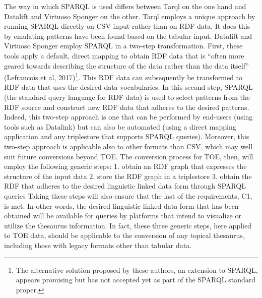The way in which SPARQL is used differs between Tarql on the one hand and Datalift and Virtuoso Sponger on the other. Tarql employs a unique approach by running SPARQL directly on CSV input rather than on RDF data. It does this by emulating patterns have been found based on the tabular input. Datalift and Virtuoso Sponger employ SPARQL in a two-step transformation. First, these tools apply a default, direct mapping to obtain RDF data that is “often more geared towards describing the structure of the data rather than the data itself” (Lefrancois et al, 2017)\footnote{The alternative solution proposed by these authors, an extension to SPARQL, appears promising but has not accepted yet as part of the SPARQL standard proper.}. This RDF data can subsequently be transformed to RDF data that uses the desired data vocabularies. In this second step, SPARQL (the standard query language for RDF data) is used to select patterns from the RDF source and construct new RDF data that adheres to the desired patterns. Indeed, this two-step approach is one that can be performed by end-users (using tools such as Datalink) but can also be automated (using a direct mapping application and any triplestore that supports SPARQL queries). Moreover, this two-step approach is applicable also to other formats than CSV, which may well suit future conversions beyond TOE. The conversion process for TOE, then, will employ the following generic steps:
1.	obtain an RDF graph that expresses the structure of the input data
2.	store the RDF graph in a triplestore
3.	obtain the RDF that adheres to the desired linguistic linked data form through SPARQL queries
Taking these steps will also ensure that the last of the requirements, C1, is met. In other words, the desired linguistic linked data form that has been obtained will be available for queries by platforms that intend to visualize or utilize the thesaurus information. In fact, these three generic steps, here applied to TOE data, should be applicable to the conversion of any topical thesaurus, including those with legacy formats other than tabular data.

